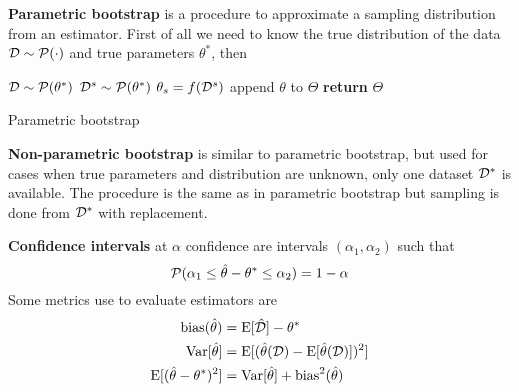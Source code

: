 \documentclass[../main.tex]{subfiles}
\begin{document}
\textbf{Parametric bootstrap} is a procedure to approximate a sampling distribution from an estimator. First of all we need to know the true distribution of the data $\mathcal{D}\sim\mathcal{P}(\cdot)$ and true parameters $\theta^*$, then 
\begin{algorithm}[H]
\begin{algorithmic}
    \State $\mathcal{D}\sim\mathcal{P}(\theta^*)$
        \State $\mathcal{D}^s \sim \mathcal{P}(\theta^*)$
        \State $\theta_s=f(\mathcal{D}^s)$
        \State append $\theta$ to $\Theta$
    \EndFor
    \State \textbf{return} $\Theta$
\end{algorithmic}
\caption{Parametric bootstrap}
\end{algorithm}

\textbf{Non-parametric bootstrap} is similar to parametric bootstrap, but used for cases when true parameters and distribution are unknown, only one dataset $\mathcal{D}^*$ is available. The procedure is the same as in parametric bootstrap but sampling is done from $\mathcal{D}^*$ with replacement.

\textbf{Confidence intervals} at $\alpha$ confidence are intervals $(\alpha_1,\alpha_2)$ such that
\begin{equation*}
    \mathcal{P}(\alpha_1\le \hat{\theta}-\theta^* \le\alpha_2)=1-\alpha
\end{equation*}
Some metrics use to evaluate estimators are
\begin{align*}
    \mathrm{bias}(\hat{\theta}) &= \mathrm{E}[\hat{\mathcal{D}}]-\theta^*\\
    \mathrm{Var}[\hat{\theta}] &= \mathrm{E}[(\hat{\theta}(\mathcal{D}) - \mathrm{E}[\hat{\theta}(\mathcal{D})] )^2 ]\\
    \mathrm{E}[(\hat{\theta} - \theta^*)^2] &= \mathrm{Var}[\hat{\theta}] + \mathrm{bias}^2(\hat{\theta})
\end{align*}
\end{document}
